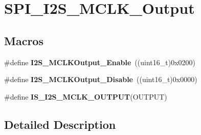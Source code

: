 \hypertarget{group___s_p_i___i2_s___m_c_l_k___output}{\section{S\-P\-I\-\_\-\-I2\-S\-\_\-\-M\-C\-L\-K\-\_\-\-Output}
\label{group___s_p_i___i2_s___m_c_l_k___output}
}
\subsection*{Macros}
\begin{DoxyCompactItemize}
\item 
\hypertarget{group___s_p_i___i2_s___m_c_l_k___output_ga99713ee8c824f4d3bb25a9ce7bf5312a}{\#define {\bfseries I2\-S\-\_\-\-M\-C\-L\-K\-Output\-\_\-\-Enable}~((uint16\-\_\-t)0x0200)}\label{group___s_p_i___i2_s___m_c_l_k___output_ga99713ee8c824f4d3bb25a9ce7bf5312a}

\item 
\hypertarget{group___s_p_i___i2_s___m_c_l_k___output_gaea09824d7e6359924152277ed3661e7e}{\#define {\bfseries I2\-S\-\_\-\-M\-C\-L\-K\-Output\-\_\-\-Disable}~((uint16\-\_\-t)0x0000)}\label{group___s_p_i___i2_s___m_c_l_k___output_gaea09824d7e6359924152277ed3661e7e}

\item 
\#define {\bfseries I\-S\-\_\-\-I2\-S\-\_\-\-M\-C\-L\-K\-\_\-\-O\-U\-T\-P\-U\-T}(O\-U\-T\-P\-U\-T)
\end{DoxyCompactItemize}


\subsection{Detailed Description}


